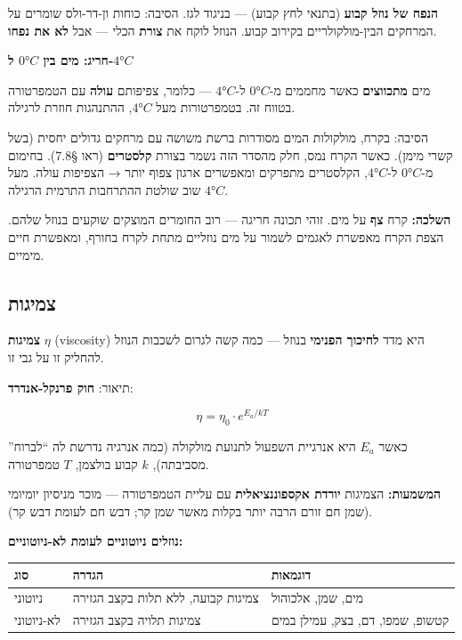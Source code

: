 \documentclass[
  hebrew,
  letterpaper,
  DIV=11,
  numbers=noendperiod]{scrreprt}
\newcounter{none} %
\begin{document}
\textbf{הנפח של נוזל קבוע} (בתנאי לחץ קבוע) --- בניגוד לגז. הסיבה: כוחות
ון-דר-ולס שומרים על המרחקים הבין-מולקולריים בקירוב קבוע. הנוזל לוקח את
\textbf{צורת} הכלי --- אבל \textbf{לא את נפחו}.

\textbf{חריג: מים בין \(0°C\) ל-\(4°C\)}

מים \textbf{מתכווצים} כאשר מחממים מ-\(0°C\) ל-\(4°C\) --- כלומר, צפיפותם
\textbf{עולה} עם הטמפרטורה בטווח זה. בטמפרטורות מעל \(4°C\), ההתנהגות
חוזרת לרגילה.

הסיבה: בקרח, מולקולות המים מסודרות ברשת משושה עם מרחקים גדולים יחסית
(בשל קשרי מימן). כאשר הקרח נמס, חלק מהסדר הזה נשמר בצורת
\textbf{קלסטרים} (ראו §7.8). בחימום מ-\(0°C\) ל-\(4°C\), הקלסטרים
מתפרקים ומאפשרים ארגון צפוף יותר → הצפיפות עולה. מעל \(4°C\) שוב שולטת
ההתרחבות התרמית הרגילה.

\textbf{השלכה:} קרח \textbf{צף} על מים. זוהי תכונה חריגה --- רוב החומרים
המוצקים שוקעים בנוזל שלהם. הצפת הקרח מאפשרת לאגמים לשמור על מים נוזליים
מתחת לקרח בחורף, ומאפשרת חיים מימיים.

\subsection{צמיגות}\label{ux5e6ux5deux5d9ux5d2ux5d5ux5ea}

\textbf{צמיגות} \(\eta\) (viscosity) היא מדד \textbf{לחיכוך הפנימי}
בנוזל --- כמה קשה לגרום לשכבות הנוזל להחליק זו על גבי זו.

תיאור: \textbf{חוק פרנקל-אנדרד}:

\[\eta = \eta_0 \cdot e^{E_a / kT}\]

כאשר \(E_a\) היא אנרגיית השפעול לתנועת מולקולה (כמה אנרגיה נדרשת לה
``לברוח'' מסביבתה), \(k\) קבוע בולצמן, \(T\) טמפרטורה.

\textbf{המשמעות:} הצמיגות \textbf{יורדת אקספוננציאלית} עם עליית
הטמפרטורה --- מוכר מניסיון יומיומי (שמן חם זורם הרבה יותר בקלות מאשר שמן
קר; דבש חם לעומת דבש קר).

\textbf{נוזלים ניוטוניים לעומת לא-ניוטוניים:}

{\def\LTcaptype{none} %
\begin{longtable}[]{@{}
  >{\raggedright\arraybackslash}p{}
  >{\raggedright\arraybackslash}p{}
  >{\raggedright\arraybackslash}p{}@{}}
\toprule\noalign{}
\begin{minipage}[b]{\linewidth}\raggedright
סוג
\end{minipage} & \begin{minipage}[b]{\linewidth}\raggedright
הגדרה
\end{minipage} & \begin{minipage}[b]{\linewidth}\raggedright
דוגמאות
\end{minipage} \\
\midrule\noalign{}
\endhead
\bottomrule\noalign{}
\endlastfoot
ניוטוני & צמיגות קבועה, ללא תלות בקצב הגזירה & מים, שמן, אלכוהול \\
לא-ניוטוני & צמיגות תלויה בקצב הגזירה & קטשופ, שמפו, דם, בצק, עמילן
במים \\
\end{longtable}
}
\end{document}
